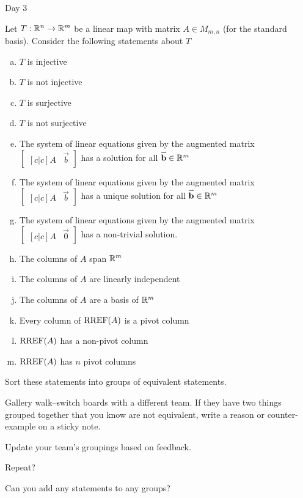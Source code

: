 
\begin{applicationActivities}{Day 3}

\begin{activity}
Let $T: \mathbb{R}^n \rightarrow \mathbb{R}^m$ be a linear map with matrix $A \in M_{m,n}$ (for the standard basis).  Consider the following statements about $T$
\begin{enumerate}[(a)]
\item $T$ is injective
\item $T$ is not injective
\item $T$ is surjective
\item $T$ is not surjective
\item The system of linear equations given by the augmented matrix $\begin{bmatrix}[c|c]A & \vec{b} \end{bmatrix}$ has a solution for all $\mathbf{\accentset{\rightharpoonup}{b}} \in \mathbb{R}^m$
\item The system of linear equations given by the augmented matrix $\begin{bmatrix}[c|c]A & \vec{b} \end{bmatrix}$ has a unique solution for all $\mathbf{\accentset{\rightharpoonup}{b}} \in \mathbb{R}^m$
\item The system of linear equations given by the augmented matrix $\begin{bmatrix}[c|c] A & \vec{0} \end{bmatrix}$ has a non-trivial solution.
\item The columns of $A$ span $\mathbb{R}^m$
\item The columns of $A$ are linearly independent
\item The columns of $A$ are a basis of $\mathbb{R}^m$
\item Every column of $\operatorname{RREF}(A)$ is a pivot column
\item $\operatorname{RREF}(A)$ has a non-pivot column
\item $\operatorname{RREF}(A)$ has $n$ pivot columns
\end{enumerate}
Sort these statements into groups of equivalent statements.
\end{activity}

\begin{activity}
Gallery walk--switch boards with a different team.  If they have two things grouped together that you know are not equivalent, write a reason or counter-example on a sticky note.
\end{activity}

\begin{activity}
Update your team's groupings based on feedback.
\end{activity}

\begin{activity}
Repeat?
\end{activity}

\begin{activity}
Can you add any statements to any groups?
\end{activity}

\end{applicationActivities}
